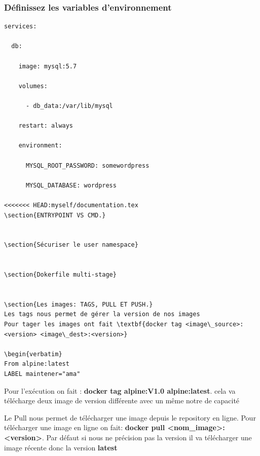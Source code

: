 \documentclass[12pt,a4paper]{article}
\begin{document}
\subsubsection{Définissez les variables d'environnement}
\begin{verbatim}
services:

  db:

    image: mysql:5.7

    volumes:

      - db_data:/var/lib/mysql

    restart: always

    environment:

      MYSQL_ROOT_PASSWORD: somewordpress

      MYSQL_DATABASE: wordpress

<<<<<<< HEAD:myself/documentation.tex
\section{ENTRYPOINT VS CMD.}


\section{Sécuriser le user namespace}


\section{Dokerfile multi-stage}


\section{Les images: TAGS, PULL ET PUSH.}
Les tags nous permet de gérer la version de nos images
Pour tager les images ont fait \textbf{docker tag <image\_source>:<version> <image\_dest>:<version>}

\begin{verbatim}
From alpine:latest
LABEL maintener="ama"
\end{verbatim}
Pour l'exécution on fait : \textbf{docker tag alpine:V1.0 alpine:latest}. cela va télécharge deux image de version différente avec un même notre de capacité

Le Pull nous permet de télécharger une image depuis le repository en ligne. Pour télécharger une image en ligne on fait: \textbf{docker pull <nom\_image>:<version>}. Par défaut si nous ne précision pas la version il va télécharger une image récente donc la version \textbf{latest}
\end{document}
